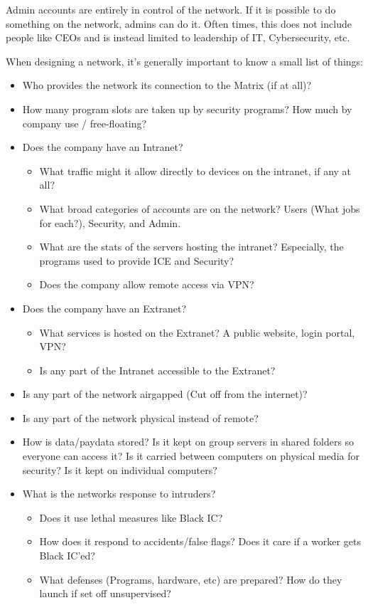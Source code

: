 \begin{multicols}{3}
	Admin accounts are entirely in control of the network. If it is possible to do something on the network, admins can do it. Often times, this does not include people like CEOs and is instead limited to leadership of IT, Cybersecurity, etc.
	
	When designing a network, it's generally important to know a small list of things: 
	
	\begin{itemize}
		\itemsep 0pt
		\item Who provides the network its connection to the Matrix (if at all)? 
		\item How many program slots are taken up by security programs? How much by company use / free-floating?
		\item Does the company have an Intranet?
		\begin{itemize}
			\itemsep 0pt
			\item What traffic might it allow directly to devices on the intranet, if any at all?
			\item What broad categories of accounts are on the network? Users (What jobs for each?), Security, and Admin.
			\item What are the stats of the servers hosting the intranet? Especially, the programs used to provide ICE and Security?
			\item Does the company allow remote access via VPN?
		\end{itemize}
		\item Does the company have an Extranet?
		\begin{itemize}
			\itemsep 0pt
			\item What services is hosted on the Extranet? A public website, login portal, VPN?
			\item Is any part of the Intranet accessible to the Extranet?
		\end{itemize}
		\item Is any part of the network airgapped (Cut off from the internet)?
		\item Is any part of the network physical instead of remote?
		\item How is data/paydata stored? Is it kept on group servers in shared folders so everyone can access it? Is it carried between computers on physical media for security? Is it kept on individual computers?
		\item What is the networks response to intruders?
		\begin{itemize}
			\itemsep 0pt
			\item Does it use lethal measures like Black IC?
			\item How does it respond to accidents/false flags? Does it care if a worker gets Black IC'ed?
			\item What defenses (Programs, hardware, etc) are prepared? How do they launch if set off unsupervised?
		\end{itemize}
	\end{itemize} 
	

\end{multicols}
